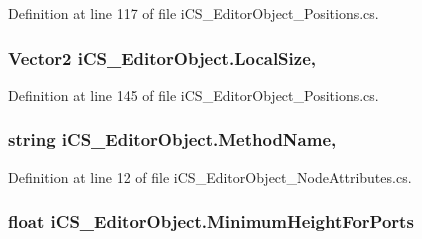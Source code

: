 Definition at line 117 of file i\+C\+S\+\_\+\+Editor\+Object\+\_\+\+Positions.\+cs.

\hypertarget{classi_c_s___editor_object_a5c4ef242b4f19647a9981b9e8d9dff0b}{
\subsubsection[{Local\+Size}]{\setlength{\rightskip}{0pt plus 5cm}Vector2 i\+C\+S\+\_\+\+Editor\+Object.\+Local\+Size\hspace{0.3cm}{\ttfamily [get]}, {\ttfamily [set]}}}\label{classi_c_s___editor_object_a5c4ef242b4f19647a9981b9e8d9dff0b}


Definition at line 145 of file i\+C\+S\+\_\+\+Editor\+Object\+\_\+\+Positions.\+cs.

\hypertarget{classi_c_s___editor_object_aae3da6bd809701bc0d839c7bc41310e0}{
\subsubsection[{Method\+Name}]{\setlength{\rightskip}{0pt plus 5cm}string i\+C\+S\+\_\+\+Editor\+Object.\+Method\+Name\hspace{0.3cm}{\ttfamily [get]}, {\ttfamily [set]}}}\label{classi_c_s___editor_object_aae3da6bd809701bc0d839c7bc41310e0}


Definition at line 12 of file i\+C\+S\+\_\+\+Editor\+Object\+\_\+\+Node\+Attributes.\+cs.

\hypertarget{classi_c_s___editor_object_a0ad12d7c4b71e777f951f83c2a27fd69}{
\subsubsection[{Minimum\+Height\+For\+Ports}]{\setlength{\rightskip}{0pt plus 5cm}float i\+C\+S\+\_\+\+Editor\+Object.\+Minimum\+Height\+For\+Ports\hspace{0.3cm}{\ttfamily [get]}}}\label{classi_c_s___editor_object_a0ad12d7c4b71e777f951f83c2a27fd69}


